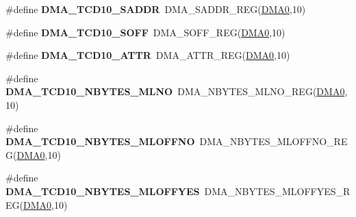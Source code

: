 \begin{DoxyCompactItemize}
\item 
\#define {\bfseries D\+M\+A\+\_\+\+T\+C\+D10\+\_\+\+S\+A\+D\+DR}~D\+M\+A\+\_\+\+S\+A\+D\+D\+R\+\_\+\+R\+EG(\hyperlink{group__DMA__Peripheral__Access__Layer_ga4103044f9ca209772f513dc694513ffb}{D\+M\+A0},10)\hypertarget{group__DMA__Register__Accessor__Macros_ga43def64208954cf8918f00a5c2e8a5c3}{}\label{group__DMA__Register__Accessor__Macros_ga43def64208954cf8918f00a5c2e8a5c3}

\item 
\#define {\bfseries D\+M\+A\+\_\+\+T\+C\+D10\+\_\+\+S\+O\+FF}~D\+M\+A\+\_\+\+S\+O\+F\+F\+\_\+\+R\+EG(\hyperlink{group__DMA__Peripheral__Access__Layer_ga4103044f9ca209772f513dc694513ffb}{D\+M\+A0},10)\hypertarget{group__DMA__Register__Accessor__Macros_ga1785c39374b58b8f0fb1fee6557b8c9e}{}\label{group__DMA__Register__Accessor__Macros_ga1785c39374b58b8f0fb1fee6557b8c9e}

\item 
\#define {\bfseries D\+M\+A\+\_\+\+T\+C\+D10\+\_\+\+A\+T\+TR}~D\+M\+A\+\_\+\+A\+T\+T\+R\+\_\+\+R\+EG(\hyperlink{group__DMA__Peripheral__Access__Layer_ga4103044f9ca209772f513dc694513ffb}{D\+M\+A0},10)\hypertarget{group__DMA__Register__Accessor__Macros_ga4ce82c87fd6f3680ce6c8deceb6653e7}{}\label{group__DMA__Register__Accessor__Macros_ga4ce82c87fd6f3680ce6c8deceb6653e7}

\item 
\#define {\bfseries D\+M\+A\+\_\+\+T\+C\+D10\+\_\+\+N\+B\+Y\+T\+E\+S\+\_\+\+M\+L\+NO}~D\+M\+A\+\_\+\+N\+B\+Y\+T\+E\+S\+\_\+\+M\+L\+N\+O\+\_\+\+R\+EG(\hyperlink{group__DMA__Peripheral__Access__Layer_ga4103044f9ca209772f513dc694513ffb}{D\+M\+A0},10)\hypertarget{group__DMA__Register__Accessor__Macros_ga4485cacfcff76d14742c66de54736970}{}\label{group__DMA__Register__Accessor__Macros_ga4485cacfcff76d14742c66de54736970}

\item 
\#define {\bfseries D\+M\+A\+\_\+\+T\+C\+D10\+\_\+\+N\+B\+Y\+T\+E\+S\+\_\+\+M\+L\+O\+F\+F\+NO}~D\+M\+A\+\_\+\+N\+B\+Y\+T\+E\+S\+\_\+\+M\+L\+O\+F\+F\+N\+O\+\_\+\+R\+EG(\hyperlink{group__DMA__Peripheral__Access__Layer_ga4103044f9ca209772f513dc694513ffb}{D\+M\+A0},10)\hypertarget{group__DMA__Register__Accessor__Macros_ga4d9e594844e687369d3029dc568e2892}{}\label{group__DMA__Register__Accessor__Macros_ga4d9e594844e687369d3029dc568e2892}

\item 
\#define {\bfseries D\+M\+A\+\_\+\+T\+C\+D10\+\_\+\+N\+B\+Y\+T\+E\+S\+\_\+\+M\+L\+O\+F\+F\+Y\+ES}~D\+M\+A\+\_\+\+N\+B\+Y\+T\+E\+S\+\_\+\+M\+L\+O\+F\+F\+Y\+E\+S\+\_\+\+R\+EG(\hyperlink{group__DMA__Peripheral__Access__Layer_ga4103044f9ca209772f513dc694513ffb}{D\+M\+A0},10)\hypertarget{group__DMA__Register__Accessor__Macros_ga90f9361236c52b090f87c26ef140b940}{}\label{group__DMA__Register__Accessor__Macros_ga90f9361236c52b090f87c26ef140b940}


\end{DoxyCompactItemize}
